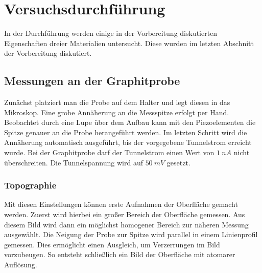 \chapter{Versuchsdurchführung}

In der Durchführung werden einige in der Vorbereitung diskutierten Eigenschaften 
dreier Materialien untersucht. Diese wurden im letzten Abschnitt der Vorbereitung
diskutiert. 

\section{Messungen an der Graphitprobe}

Zunächst platziert man die Probe auf dem Halter und legt diesen in das Mikroskop. 
Eine grobe Annäherung an die Messspitze erfolgt per Hand. Beobachtet durch eine
Lupe über dem Aufbau kann mit den Piezoelementen die Spitze genauer an die Probe
herangeführt werden. Im letzten Schritt wird die Annäherung automatisch 
ausgeführt, bis der vorgegebene Tunnelstrom erreicht wurde. Bei der Graphitprobe
darf der Tunnelstrom einen Wert von $\SI{1}{nA}$ nicht überschreiten. Die 
Tunnelspannung wird auf $\SI{50}{mV}$ gesetzt.\par

\subsection{Topographie}

Mit diesen Einstellungen können erste Aufnahmen der Oberfläche gemacht werden.
Zuerst wird hierbei ein großer Bereich der Oberfläche gemessen. Aus diesem
Bild wird dann ein möglichst homogener Bereich zur näheren Messung ausgewählt.
Die Neigung der Probe zur Spitze wird parallel in einem Linienprofil gemessen.
Dies ermöglicht einen Ausgleich, um Verzerrungen im Bild vorzubeugen.
So entsteht schließlich ein Bild der Oberfläche mit atomarer Auflösung.

